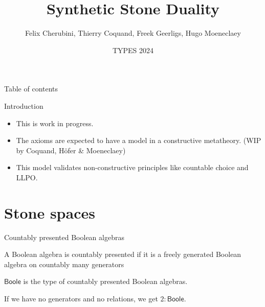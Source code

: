 \documentclass{beamer}
\newcommand{\Boole}{\mathsf{Boole}}
\newtheorem{remark}{Remark}
\begin{document}
\title{Synthetic Stone Duality}
\date{TYPES 2024}
\author{
Felix Cherubini, Thierry Coquand, Freek Geerligs, Hugo Moeneclaey}
\maketitle
\begin{frame}{Table of contents}
\tableofcontents
\end{frame}
\begin{frame}{Introduction}
  \begin{itemize}
    \item This is work in progress. 
      \pause 
    \item The axioms are expected to have a model in a constructive metatheory. 
      (WIP by Coquand, H\"ofer \& Moeneclaey)
      \pause
    \item 
      This model validates non-constructive principles like countable choice and LLPO. 
  \end{itemize}
\end{frame}

  \section{Stone spaces}%
\begin{frame}{Countably presented Boolean algebras}
  \begin{definition}
    A Boolean algebra is countably presented if it is a 
    \pause freely generated Boolean algebra on countably many generators
  \end{definition}
  \pause 
  \pause
  \begin{definition}
    $\Boole$ is the type of countably presented Boolean algebras. 
  \end{definition}
  \pause 
  \begin{example}
    If we have no generators and no relations, we get $2:\Boole$.
  \end{example}
\end{frame}
\end{document}
